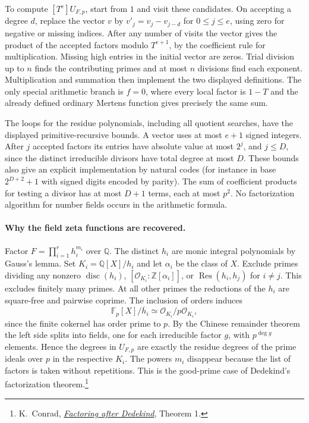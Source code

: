 To compute $[T^e]U_{F,p}$, start from $1$ and visit these candidates.
On accepting a degree $d$, replace the vector $v$ by
$v'_j=v_j-v_{j-d}$ for $0\le j\le e$, using zero for negative or missing
indices. After any number of visits the vector gives the product of
the accepted factors modulo $T^{e+1}$, by the coefficient rule for
multiplication. Missing high entries in the initial vector are zeros.
Trial division up to $n$ finds the contributing primes and at most $n$
divisions find each exponent. Multiplication and summation then
implement the two displayed definitions. The only special arithmetic
branch is $f=0$, where every local factor is $1-T$ and the already defined
ordinary Mertens function gives precisely the same sum.

The loops for the residue polynomials, including all quotient searches,
have the displayed primitive-recursive bounds. A vector uses at most
$e+1$ signed integers. After $j$ accepted factors its entries have
absolute value at most $2^j$, and $j\le D$, since the distinct
irreducible divisors have total degree at most $D$. These bounds also
give an explicit implementation by natural codes (for instance in base
$2^{D+2}+1$ with signed digits encoded by parity). The sum of coefficient
products for testing a divisor has at most $D+1$ terms, each at most
$p^2$. No factorization algorithm for number fields occurs in the
arithmetic formula.

\paragraph{Why the field zeta functions are recovered.}
Factor $F=\prod_{i=1}^r h_i^{m_i}$ over $\mathbb Q$. The distinct $h_i$
are monic integral polynomials by Gauss's lemma. Set
$K_i=\mathbb Q[X]/h_i$ and let $\alpha_i$ be the class of $X$.
Exclude primes dividing any nonzero
$\operatorname{disc}(h_i)$, $[\mathcal O_{K_i}:\mathbb Z[\alpha_i]]$,
or $\operatorname{Res}(h_i,h_j)$ for $i\ne j$. This excludes finitely
many primes. At all other primes the reductions of the $h_i$ are
square-free and pairwise coprime. The inclusion of orders induces
\[
 \mathbb F_p[X]/\overline h_i
       \simeq \mathcal O_{K_i}/p\mathcal O_{K_i},
\]
since the finite cokernel has order prime to $p$. By the Chinese
remainder theorem the left side splits into fields, one for each
irreducible factor $g$, with $p^{\deg g}$ elements. Hence the degrees
in $U_{F,p}$ are exactly the residue degrees of the prime ideals over
$p$ in the respective $K_i$. The powers $m_i$ disappear because the
list of factors is taken without repetitions. This is the good-prime
case of Dedekind's factorization theorem.\footnote{K.~Conrad,
\href{https://kconrad.math.uconn.edu/math5230f12/handouts/dedekindfactor.pdf}
{\emph{Factoring after Dedekind}}, Theorem 1.}

